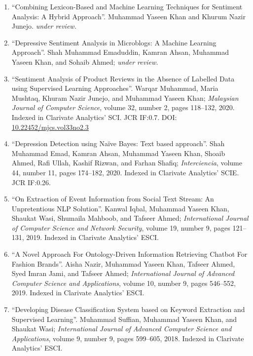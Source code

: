 \documentclass[a4paper, 10pt]{article}
\begin{document}
\begin{enumerate}
\itemsep-4pt 
	\item ``Combining Lexicon-Based and Machine Learning Techniques for Sentiment Analysis: A Hybrid Approach''. Muhammad Yaseen Khan and Khurum Nazir Junejo. \emph{\small under review.}
       
	\item ``Depressive Sentiment Analysis in Microblogs: A Machine Learning Approach''. Shah Muhammad Emaduddin, Kamran Ahsan, Muhammad Yaseen Khan, and Sohaib Ahmed; \emph{\small under review.}
       
    \item ``Sentiment Analysis of Product Reviews in the Absence of Labelled Data using Supervised Learning Approaches''. Warqar Muhammad, Maria Mushtaq, Khuram Nazir Junejo, and Muhammad Yaseen Khan; \emph{Malaysian Journal of Computer Science}, volume 32, number 2, pages 118--132, 2020. Indexed in Clarivate Analytics' SCI. JCR IF:0.7. DOI: \href{10.22452/mjcs.vol33no2.3}{10.22452/mjcs.vol33no2.3}
    
    \item ``Depression Detection using Naïve Bayes: Text based approach''. Shah Muhammad Emad, Kamran Ahsan, Muhammad Yaseen Khan, Shoaib Ahmed, Rafi Ullah, Kashif Rizwan, and Farhan Shafiq; \emph{Interciencia}, volume 44, number 11, pages 174--182, 2020. Indexed in Clarivate Analytics' SCIE. JCR IF:0.26.
	
	\item ``On Extraction of Event Information from Social Text Stream: An Unpretentious NLP Solution''. Kanwal Iqbal, Muhammad Yaseen Khan, Shaukat Wasi, Shumaila Mahboob, and Tafseer Ahmed; \emph{International Journal of Computer Science and Network Security}, volume 19, number 9, pages 121--131, 2019. Indexed in Clarivate Analytics' ESCI.
 
	\item ``A Novel Approach For Ontology-Driven Information Retrieving Chatbot For Fashion Brands''. Aisha Nazir, Muhammad Yaseen Khan, Tafseer Ahmed, Syed Imran Jami, and Tafseer Ahmed; \emph{International Journal of Advanced Computer Science and Applications}, volume 10, number 9, pages 546--552, 2019. Indexed in Clarivate Analytics' ESCI. 
      
	\item ``Developing Disease Classification System based on Keyword Extraction and Supervised Learning''. Muhammad Suffian, Muhammad Yaseen Khan, and Shaukat Wasi; \emph{International Journal of Advanced Computer Science and Applications}, volume 9, number 9, pages 599--605, 2018. Indexed in Clarivate Analytics' ESCI.
\end{enumerate}
\end{document}
